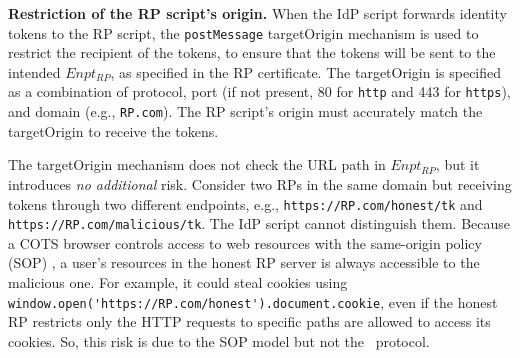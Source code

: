 
\oldc

\noindent \textbf{Restriction of the RP script's origin.}
When the IdP script forwards identity tokens to the RP script, the \verb+postMessage+ targetOrigin mechanism \cite{postm-targeto} is used to restrict the recipient of the tokens, to ensure that the tokens will be sent to the intended $Enpt_{RP}$, as specified in the RP certificate. The targetOrigin is specified as a combination of protocol, port (if not present, 80 for \verb+http+ and 443 for \verb+https+), and domain (e.g., \verb+RP.com+).
The RP script's origin must accurately match the targetOrigin to receive the tokens.

The targetOrigin mechanism does not check the URL path in $Enpt_{RP}$, but it introduces {\em no additional} risk.
Consider two RPs in the same domain but receiving tokens through two different endpoints,
 e.g., \verb+https://RP.com/honest/tk+ and \verb+https://RP.com/malicious/tk+.
The IdP script cannot distinguish them.
%
%
Because a COTS browser controls access to web resources with the same-origin policy (SOP) \cite{sop},
    a user's resources in the honest RP server is always accessible to  the malicious one.
 For example, it could steal cookies using \verb+window.open('https://RP.com/honest').document.cookie+,
 even if the honest RP restricts only the HTTP requests to specific paths are allowed to access its cookies.
%
%
 So, this risk is due to the SOP model but not the \usso\ protocol.

